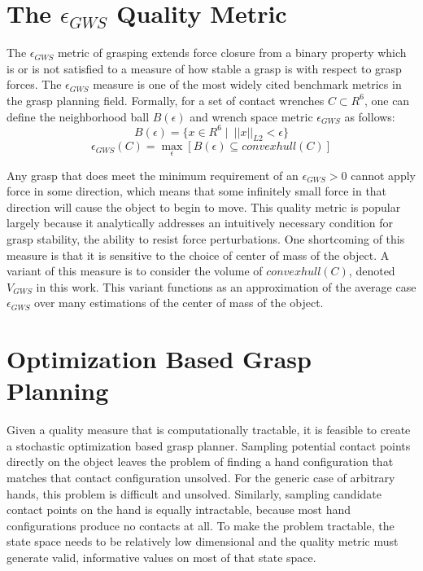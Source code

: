 \section{The $\epsilon_{GWS}$ Quality Metric}
The $\epsilon_{GWS}$ metric of grasping extends force closure from a binary property which is or is not satisfied to a measure of how stable a grasp is with respect to grasp forces. The $\epsilon_{GWS}$ measure is one of the most widely cited 
benchmark metrics in the grasp planning field\cite{ferraricanny}.  Formally, for a set of contact wrenches $C\subset R^6$, one can define the neighborhood ball $B(\epsilon)$ and wrench space metric $\epsilon_{GWS}$ as follows: 
$$B(\epsilon) = \{x\in R^6 \mid \  ||x||_{L2} < \epsilon\}$$ 
$$\epsilon_{GWS} (C) = \max_{ \epsilon } [B(\epsilon )\subseteq  convexhull(C)] $$\par
Any grasp that does meet the minimum requirement of an $\epsilon_{GWS} > 0$ cannot apply force in some direction, which means that some infinitely small force in that direction will cause the object to begin to move. This quality metric is popular largely because it analytically addresses  an intuitively necessary condition for grasp stability, the ability to resist force perturbations.   One shortcoming of this measure is that it is sensitive to the choice of center of mass of the object.  A variant of this measure is to consider the volume of $convexhull(C)$, denoted $V_{GWS}$ in this work.  This variant functions as an approximation of the average case $\epsilon_{GWS}$ over many estimations of the center of mass of the object. \par

\section{Optimization Based Grasp Planning}
Given a quality measure that is computationally tractable, it is feasible to create a stochastic optimization based grasp planner. Sampling potential contact points directly on the object leaves the problem of finding a hand configuration that matches that contact configuration unsolved. For the generic case of arbitrary hands, this problem is difficult and unsolved. Similarly, sampling candidate contact points on the hand is equally intractable, because most hand configurations produce no contacts at all. To make the problem tractable, the state space needs to be relatively low dimensional and the quality metric must generate valid, informative values on most of that state space. 

